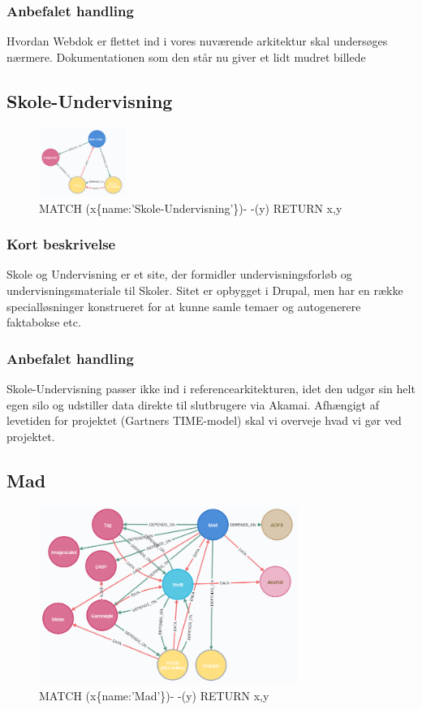 \documentclass{article}
\begin{document}
\subsubsection*{Anbefalet handling}
Hvordan Webdok er flettet ind i vores nuværende arkitektur skal undersøges nærmere. Dokumentationen som den står nu giver et lidt mudret billede



\subsection{Skole-Undervisning}
\begin{figure}[h]
\includegraphics[width=80pt]{Skole-Undervisning.PNG}
\caption{MATCH (x\{name:'Skole-Undervisning'\})- -(y) RETURN x,y}
\end{figure}
\subsubsection*{Kort beskrivelse}
Skole og Undervisning er et site, der formidler undervisningsforløb og undervisningsmateriale til Skoler.  Sitet er opbygget i Drupal, men har en række specialløsninger konstrueret for at kunne samle temaer og autogenerere faktabokse etc. 
\subsubsection*{Anbefalet handling}
Skole-Undervisning passer ikke ind i referencearkitekturen, idet den udgør sin helt egen silo og udstiller data direkte til slutbrugere via Akamai. 
Afhængigt af levetiden for projektet (Gartners TIME-model) skal vi overveje hvad vi gør ved projektet.


\subsection{Mad}
\begin{figure}[h]
\includegraphics[width=240pt]{Mad.PNG}
\caption{MATCH (x\{name:'Mad'\})- -(y) RETURN x,y}
\end{figure}
\end{document}
